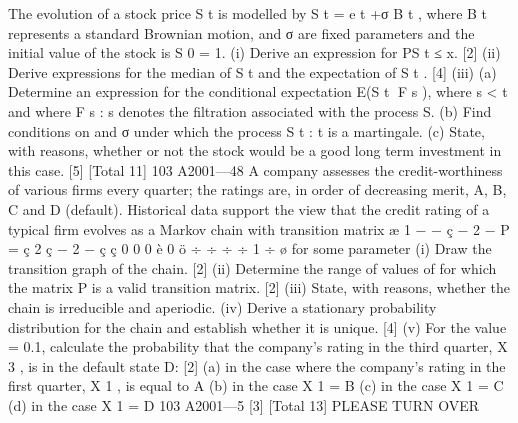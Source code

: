 \documentclass[a4paper,12pt]{article}
\begin{document}
\begin{enumerate}



The evolution of a stock price S t is modelled by
S t = e \mu t +σ B t ,
where B t represents a standard Brownian motion, \mu and σ are fixed parameters
and the initial value of the stock is S 0 = 1.
(i) Derive an expression for P{S t ≤ x}. [2]
(ii) Derive expressions for the median of S t and the expectation of S t . [4]
(iii) (a) Determine an expression for the conditional expectation E(S t F s ),
where s < t and where {F s : s } denotes the filtration associated
with the process S.
(b) Find conditions on \mu and σ under which the process {S t : t } is a
martingale.
(c) State, with reasons, whether or not the stock would be a good long
term investment in this case.
[5]
[Total 11]
103 A2001—48
A company assesses the credit-worthiness of various firms every quarter; the
ratings are, in order of decreasing merit, A, B, C and D (default). Historical data
support the view that the credit rating of a typical firm evolves as a Markov
chain with transition matrix
æ 1 − \alpha − 
\alpha
{}
ç
 − 2 \alpha − 
\alpha
P = ç
2
ç
\alpha
{} − 2 \alpha − 
ç ç
0
0
0
è
0 ö
÷
 ÷
\alpha ÷
÷
1 ÷ ø
for some parameter \alpha
(i) Draw the transition graph of the chain. [2]
(ii) Determine the range of values of \alpha for which the matrix P is a valid
transition matrix. [2]
(iii) State, with reasons, whether the chain is irreducible and aperiodic.
(iv) Derive a stationary probability distribution for the chain and establish
whether it is unique.
[4]
(v) For the value \alpha = 0.1, calculate the probability that the company’s rating
in the third quarter, X 3 , is in the default state D:
[2]
(a) in the case where the company’s rating in the first quarter, X 1 , is
equal to A
(b) in the case X 1 = B
(c) in the case X 1 = C
(d) in the case X 1 = D
103 A2001—5
[3]
[Total 13]
PLEASE TURN OVER


\end{enumerate}
\end{document}
